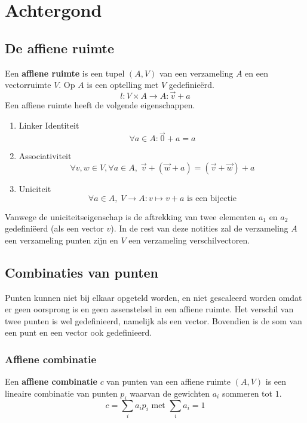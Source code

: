 \documentclass[computergesteund_ontwerp_van_curven_en_oppervlakken.tex]{subfiles}
\begin{document}
\chapter{Achtergond}
\section{De affiene ruimte}
\begin{de}
Een \textbf{affiene ruimte} is een tupel $(A,V)$ van een verzameling $A$ en een vectorruimte $V$. Op $A$ is een optelling met $V$ gedefinie\"erd.
\[
l: V \times A \rightarrow A: \vec{v}+a
\]
Een affiene ruimte heeft de volgende eigenschappen.
\begin{enumerate}
\item Linker Identiteit
\[
\forall a \in A: \vec{0} + a = a
\]
\item Associativiteit
\[
\forall v, w \in V, \forall a \in A,\; \vec{v} + (\vec{w} + a) = (\vec{v} + \vec{w}) + a
\]
\item Uniciteit
\[
\forall a \in A,\; V \to A\colon v \mapsto v + a \text{ is een bijectie}\]
\end{enumerate}
Vanwege de uniciteitseigenschap is de aftrekking van twee elementen $a_1$ en $a_2$ gedefini\"eerd (als een vector $v$). In de rest van deze notities zal de verzameling $A$ een verzameling punten zijn en $V$ een verzameling verschilvectoren.
\end{de}


\section{Combinaties van punten}
Punten kunnen niet bij elkaar opgeteld worden, en niet gescaleerd worden omdat er geen oorsprong is en geen assenstelsel in een affiene ruimte.
Het verschil van twee punten is wel gedefinieerd, namelijk als een vector. Bovendien is de som van een punt en een vector ook gedefinieerd.
\subsection{Affiene combinatie}
\label{affiene_combinatie}
\begin{de}
Een \textbf{affiene combinatie} $c$ van punten van een affiene ruimte $(A,V)$ is een lineaire combinatie van punten $p_i$ waarvan de gewichten $a_i$ sommeren tot $1$.
\[
c = \sum_{i}a_ip_i \text{ met } \sum_{i}a_i = 1
\]
\end{de}
\end{document}

